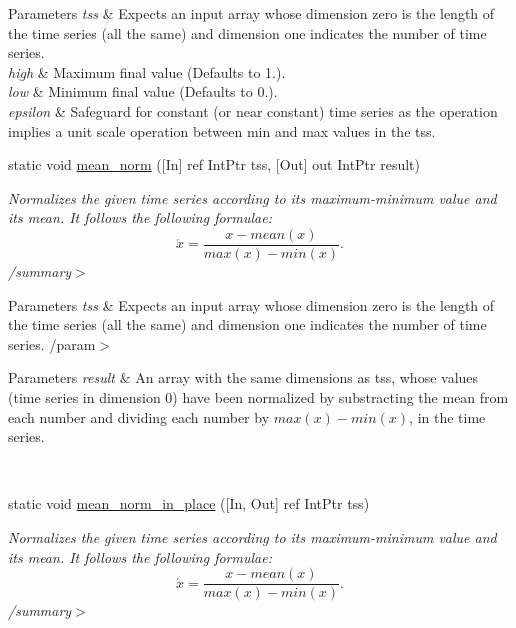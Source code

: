 \begin{DoxyCompactItemize}
\begin{DoxyCompactList}
\begin{DoxyParams}{Parameters}
{\em tss} & Expects an input array whose dimension zero is the length of the time series (all the same) and dimension one indicates the number of time series.\\
\hline
{\em high} & Maximum final value (Defaults to 1.).\\
\hline
{\em low} & Minimum final value (Defaults to 0.).\\
\hline
{\em epsilon} & Safeguard for constant (or near constant) time series as the operation implies a unit scale operation between min and max values in the tss.\\
\hline
\end{DoxyParams}
\end{DoxyCompactList}\item 
static void \mbox{\hyperlink{classkhiva_1_1interop_1_1_d_l_l_normalization_af6584451101ce922dad0d4dfb2bbe01a}{mean\+\_\+norm}} (\mbox{[}In\mbox{]} ref Int\+Ptr tss, \mbox{[}Out\mbox{]} out Int\+Ptr result)
\begin{DoxyCompactList}\small\item\em Normalizes the given time series according to its maximum-\/minimum value and its mean. It follows the following formulae\+: \[ \acute{x} = \frac{x - mean(x)}{max(x) - min(x)}. \] /summary$>$ 
\begin{DoxyParams}{Parameters}
{\em tss} & Expects an input array whose dimension zero is the length of the time series (all the same) and dimension one indicates the number of time series. /param$>$ 
\begin{DoxyParams}{Parameters}
{\em result} & An array with the same dimensions as tss, whose values (time series in dimension 0) have been normalized by substracting the mean from each number and dividing each number by $ max(x) - min(x)$, in the time series.\\
\hline
\end{DoxyParams}
\\
\hline
\end{DoxyParams}
\end{DoxyCompactList}\item 
static void \mbox{\hyperlink{classkhiva_1_1interop_1_1_d_l_l_normalization_a4a3c01d6d03e465f4e3afce9e2cfe2d9}{mean\+\_\+norm\+\_\+in\+\_\+place}} (\mbox{[}In, Out\mbox{]} ref Int\+Ptr tss)
\begin{DoxyCompactList}\small\item\em Normalizes the given time series according to its maximum-\/minimum value and its mean. It follows the following formulae\+: \[ \acute{x} = \frac{x - mean(x)}{max(x) - min(x)}. \] /summary$>$ 

\end{DoxyCompactList}
\end{DoxyCompactItemize}
